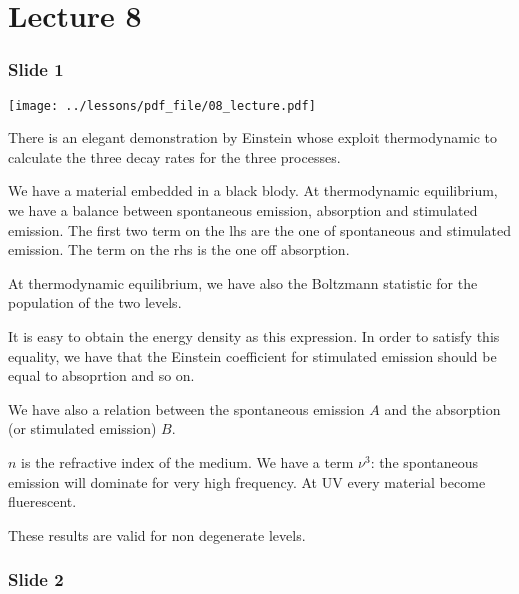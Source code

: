 \documentclass[../main/main.tex]{subfiles}
\begin{document}
\pagestyle{plain}

\section{Lecture 8}


\subsubsection*{Slide 1}

\begin{minipage}[]{0.5\linewidth}
\centering
\texttt{[image: ../lessons/pdf\_file/08\_lecture.pdf]}
\end{minipage}
\hspace{0.3cm}
\vspace{0.3cm}
\begin{minipage}[c]{0.47\linewidth}

There is an elegant demonstration by Einstein whose exploit thermodynamic to calculate the three decay rates for the three processes.

We have a material embedded in a black blody. At thermodynamic equilibrium, we have a balance between spontaneous emission, absorption and stimulated emission.
The first two term on the lhs are the one of spontaneous and stimulated emission. The term on the rhs is the one off absorption.

At thermodynamic equilibrium, we have also the Boltzmann statistic for the population of the two levels.

It is easy to obtain the energy density as this expression. In order to satisfy this equality, we have that the Einstein coefficient for stimulated emission should be equal to absoprtion and so on.

\end{minipage}

We have also a relation between the spontaneous emission \( A \) and the absorption (or stimulated emission) \( B \).

\( n \) is the refractive index of the medium. We have a term \( \nu ^3 \): the spontaneous emission will dominate for very high frequency. At UV every material become fluerescent.

These results are valid for non degenerate levels.

\subsubsection*{Slide 2}
\end{document}
